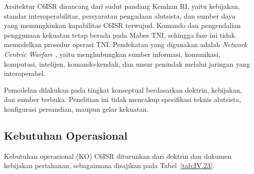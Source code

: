 Arsitektur C6ISR dirancang dari sudut pandang Kemhan RI, yaitu kebijakan, standar interoperabilitas, persyaratan pengadaan alutsista, dan sumber daya yang memungkinkan kapabilitas C6ISR terwujud. Komando dan pengendalian penggunaan kekuatan tetap berada pada Mabes TNI, sehingga fase ini tidak memodelkan prosedur operasi TNI. Pendekatan yang digunakan adalah \textit{Network Centric Warfare} \cite{Koch2015}, yaitu menghubungkan sumber informasi, komunikasi, komputasi, intelijen, komando-kendali, dan unsur penindak melalui jaringan yang interoperabel.

Pemodelan dilakukan pada tingkat konseptual berdasarkan doktrin, kebijakan, dan sumber terbuka. Penelitian ini tidak mencakup spesifikasi teknis alutsista, konfigurasi persandian, maupun gelar kekuatan.

\subsection{Kebutuhan Operasional}
\label{sec:IV.6.1}

Kebutuhan operasional (KO) C6ISR diturunkan dari doktrin dan dokumen kebijakan pertahanan, sebagaimana disajikan pada Tabel~\ref{tab:IV.23}.

